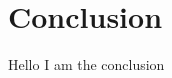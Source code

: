 \documentclass[manuscript.tex]{subfiles}
\begin{document}

\chapter{Conclusion}
Hello I am the conclusion
\end{document}
